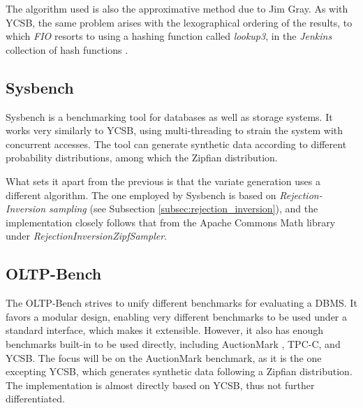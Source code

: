 The algorithm used is also the approximative method due to Jim Gray. As with \ac{YCSB}, the same problem arises with the lexographical ordering of the results, to which
\textit{FIO} resorts to using a hashing function called \textit{lookup3}, in the \textit{Jenkins} collection of hash functions \cite{jenkinsLookup3}.

\subsection{Sysbench}
Sysbench is a benchmarking tool for databases as well as storage systems. It works 
very similarly to YCSB, using multi-threading to strain the system with concurrent accesses. The tool can generate synthetic data
according to different probability distributions, among which the Zipfian distribution.

What sets it apart from the previous is that the variate generation uses a different algorithm. The one employed by Sysbench is based on \textit{Rejection-Inversion sampling} (see Subsection \ref{subsec:rejection_inversion}), 
and the implementation closely follows that from the Apache Commons Math library \cite{MathCommonsMath} under \textit{RejectionInversionZipfSampler}.

\subsection{OLTP-Bench}
The OLTP-Bench \cite{difallahOLTPBenchExtensibleTestbed2013} strives to unify different benchmarks for evaluating a \ac{DBMS}. 
It favors a modular design, enabling very different benchmarks
to be used under a standard interface, which makes it extensible. However, it also has enough benchmarks built-in to be used directly, 
including AuctionMark \cite{AuctionMarkOLTPBenchmark}, \ac{TPC-C}, and \ac{YCSB}. The focus will be on the AuctionMark benchmark,
as it is the one excepting \ac{YCSB}, which generates synthetic data following a Zipfian distribution. The implementation is almost directly based on YCSB, thus not
further differentiated.

